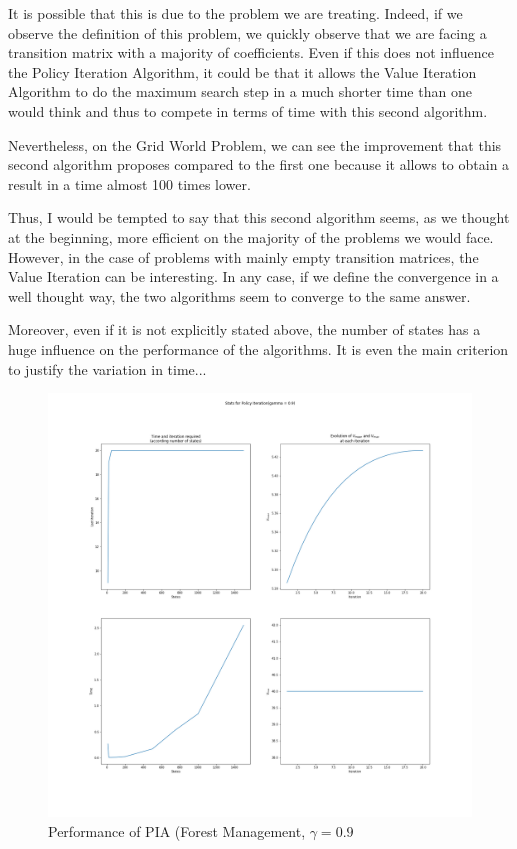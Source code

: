 \documentclass[11pt]{article}
\begin{document}
\begin{multicols}{2}
It is possible that this is due to the problem we are treating. Indeed, if we observe the definition of this problem, we quickly observe that we are facing a transition matrix with a majority of coefficients. Even if this does not influence the Policy Iteration Algorithm, it could be that it allows the Value Iteration Algorithm to do the maximum search step in a much shorter time than one would think and thus to compete in terms of time with this second algorithm.

Nevertheless, on the Grid World Problem, we can see the improvement that this second algorithm proposes compared to the first one because it allows to obtain a result in a time almost 100 times lower.

Thus, I would be tempted to say that this second algorithm seems, as we thought at the beginning, more efficient on the majority of the problems we would face. However, in the case of problems with mainly empty transition matrices, the Value Iteration can be interesting. In any case, if we define the convergence in a well thought way, the two algorithms seem to converge to the same answer.

Moreover, even if it is not explicitly stated above, the number of states has a huge influence on the performance of the algorithms. It is even the main criterion to justify the variation in time...

\begin{figure}[H]
\centering
\includegraphics[width = 0.9\columnwidth]{PI_FM_0.9.png}
\caption{Performance of PIA (Forest Management, $\gamma = 0.9$}
\end{figure}



\end{multicols}
\end{document}
